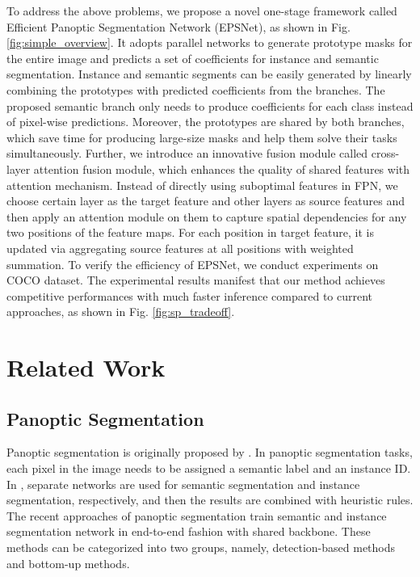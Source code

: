 \documentclass[runningheads]{llncs}
\begin{document}
To address the above problems, we propose a novel one-stage framework called Efficient Panoptic Segmentation Network (EPSNet), as shown in Fig. \ref{fig:simple_overview}. It adopts parallel networks to generate prototype masks for the entire image and predicts a set of coefficients for instance and semantic segmentation. Instance and semantic segments can be easily generated by linearly combining the prototypes with predicted coefficients from the branches. The proposed semantic branch only needs to produce coefficients for each class instead of pixel-wise predictions. Moreover, the prototypes are shared by both branches, which save time for producing large-size masks and help them solve their tasks simultaneously. Further, we introduce an innovative fusion module called cross-layer attention fusion module, which enhances the quality of shared features with attention mechanism. Instead of directly using suboptimal features in FPN, we choose certain layer as the target feature and other layers as source features and then apply an attention module on them to capture spatial dependencies for any two positions of the feature maps. For each position in target feature, it is updated via aggregating source features at all positions with weighted summation.
To verify the efficiency of EPSNet, we conduct experiments on  COCO \cite{Caesar2018} dataset. The experimental results manifest that our method achieves competitive performances with much faster inference compared to current approaches, as shown in Fig. \ref{fig:sp_tradeoff}. 





\section{Related Work}
\subsection{Panoptic Segmentation}
Panoptic segmentation is originally proposed by \cite{Li2018}. In panoptic segmentation tasks, each pixel in the image needs to be assigned a semantic label and an instance ID. In \cite{Li2018}, separate networks are used for semantic segmentation and instance segmentation, respectively, and then the results are combined with heuristic rules.
The recent approaches of panoptic segmentation train semantic and instance segmentation network in end-to-end fashion with shared backbone. These methods can be categorized into two groups, namely, detection-based methods and bottom-up methods. 
\end{document}
